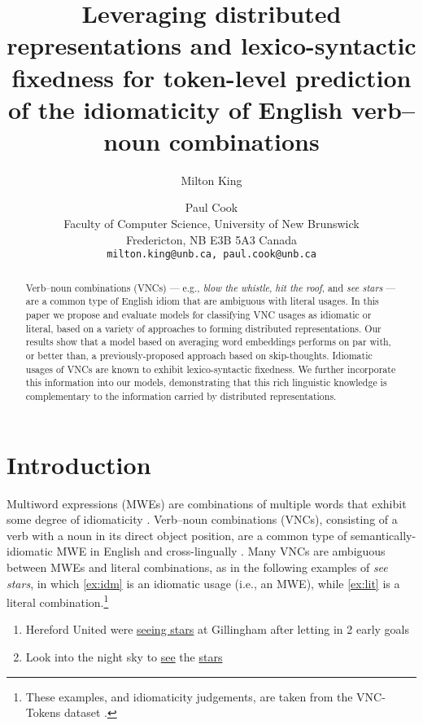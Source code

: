 \documentclass[11pt,a4paper]{article}
\title{Leveraging distributed representations and lexico-syntactic
  fixedness for token-level prediction of the idiomaticity of English
  verb--noun combinations}
\author{Milton King \and Paul Cook \\
Faculty of Computer Science, University of New Brunswick\\
Fredericton, NB E3B 5A3 Canada\\
\tt{milton.king@unb.ca}, \tt{paul.cook@unb.ca}}
\date{}
\begin{document}
\maketitle

\begin{abstract}
Verb--noun combinations (VNCs) --- e.g., \emph{blow the whistle},
\emph{hit the roof}, and \emph{see stars} --- are a common type of
English idiom that are ambiguous with literal usages. In this paper we
propose and evaluate models for classifying VNC usages as idiomatic or
literal, based on a variety of approaches to forming distributed
representations. Our results show that a model
based on averaging word embeddings performs on par with, or better
than,
a previously-proposed approach based on skip-thoughts. Idiomatic
usages of VNCs are known to exhibit lexico-syntactic fixedness. We
further incorporate this information into our models, demonstrating
that this rich linguistic knowledge is complementary to the
information carried by distributed representations.






\end{abstract}

\section{Introduction}





Multiword expressions (MWEs) are combinations of multiple words that
exhibit some degree of idiomaticity
\citep{Baldwin:Kim:2009}. Verb--noun combinations (VNCs), consisting
of a verb with a noun in its direct object position, are a common type
of semantically-idiomatic MWE in English and cross-lingually
\citep{Fazly2009}. Many VNCs are ambiguous between MWEs and literal
combinations, as in the following examples of \emph{see stars}, in
which \ref{ex:idm} is an idiomatic usage (i.e., an MWE), while
\ref{ex:lit} is a literal combination.\footnote{These examples, and
  idiomaticity judgements, are taken from the VNC-Tokens dataset
  \citep{Cook2008}.}

\begin{enumerate}
\item Hereford United were \underline{seeing stars} at Gillingham
  after letting in 2 early goals \label{ex:idm}

\item Look into the night sky to \underline{see} the
  \underline{stars} \label{ex:lit}
\end{enumerate}
\end{document}
